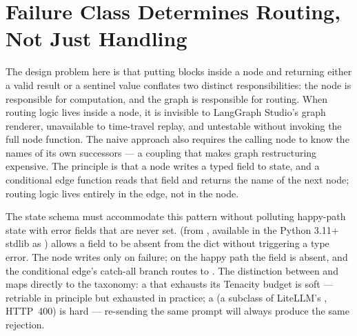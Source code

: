 \section{Failure Class Determines Routing, Not Just Handling}
\label{sec:hard-vs-soft-branches}

The design problem here is that putting  blocks inside a
node and returning either a valid result or a sentinel value conflates two
distinct responsibilities: the node is responsible for computation, and the
graph is responsible for routing. When routing logic lives inside a node,
it is invisible to LangGraph Studio's graph renderer, unavailable to
time-travel replay, and untestable without invoking the full node function.
The naive approach also requires the calling node to know the names of its
own successors --- a coupling that makes graph restructuring expensive. The
principle is that a node writes a typed  field to state,
and a conditional edge function reads that field and returns the name of the
next node; routing logic lives entirely in the edge, not in the node.

The state schema must accommodate this pattern without polluting happy-path
state with error fields that are never set.  (from
, available in the Python 3.11+ stdlib as
) allows a  field to be absent
from the dict without triggering a type error. The node writes
 only on failure; on the happy path the field is absent,
and the conditional edge's catch-all branch routes to . The
distinction between  and  maps directly to the
taxonomy: a  that exhausts its Tenacity budget is
soft --- retriable in principle but exhausted in practice; a
 (a subclass of LiteLLM's
, HTTP~400) is hard --- re-sending the same prompt
will always produce the same rejection.

